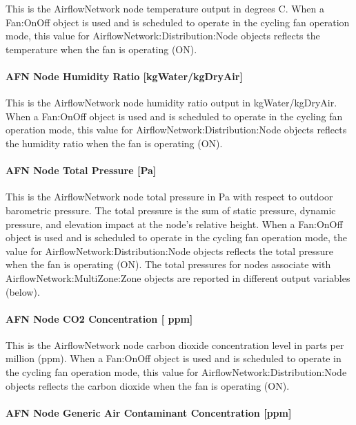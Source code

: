 This is the AirflowNetwork node temperature output in degrees C. When a Fan:OnOff object is used and is scheduled to operate in the cycling fan operation mode, this value for AirflowNetwork:Distribution:Node objects reflects the temperature when the fan is operating (ON).

\paragraph{AFN Node Humidity Ratio {[}kgWater/kgDryAir{]}}\label{afn-node-humidity-ratio-kgwaterkgdryair}

This is the AirflowNetwork node humidity ratio output in kgWater/kgDryAir. When a Fan:OnOff object is used and is scheduled to operate in the cycling fan operation mode, this value for AirflowNetwork:Distribution:Node objects reflects the humidity ratio when the fan is operating (ON).

\paragraph{AFN Node Total Pressure {[}Pa{]}}\label{afn-node-total-pressure-pa}

This is the AirflowNetwork node total pressure in Pa with respect to outdoor barometric pressure. The total pressure is the sum of static pressure, dynamic pressure, and elevation impact at the node's relative height. When a Fan:OnOff object is used and is scheduled to operate in the cycling fan operation mode, the value for AirflowNetwork:Distribution:Node objects reflects the total pressure when the fan is operating (ON). The total pressures for nodes associate with AirflowNetwork:MultiZone:Zone objects are reported in different output variables (below).

\paragraph{AFN Node CO2 Concentration {[} ppm{]}}\label{afn-node-co2-concentration-ppm}

This is the AirflowNetwork node carbon dioxide concentration level in parts per million (ppm). When a Fan:OnOff object is used and is scheduled to operate in the cycling fan operation mode, this value for AirflowNetwork:Distribution:Node objects reflects the carbon dioxide when the fan is operating (ON).

\paragraph{AFN Node Generic Air Contaminant Concentration {[}ppm{]}}\label{afn-node-generic-air-contaminant-concentration-ppm}

